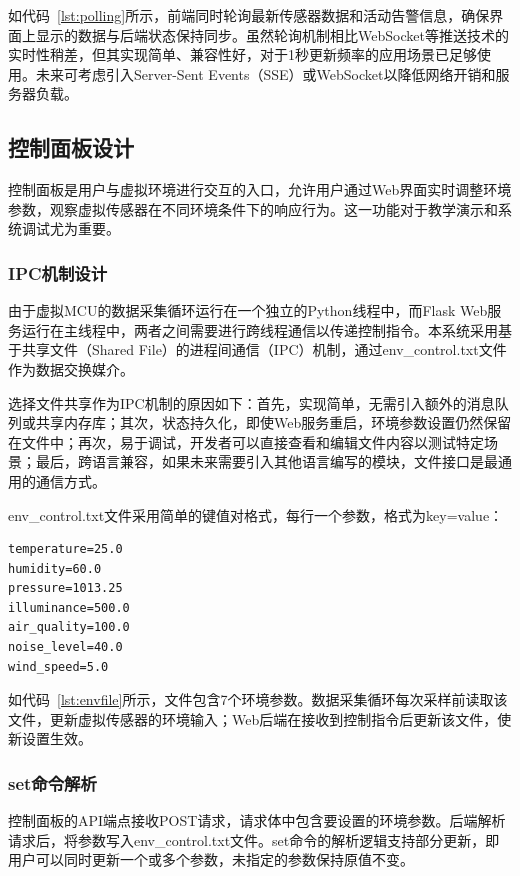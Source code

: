 \documentclass[12pt,a4paper]{ctexart}
\begin{document}
如代码~\ref{lst:polling}所示，前端同时轮询最新传感器数据和活动告警信息，确保界面上显示的数据与后端状态保持同步。虽然轮询机制相比WebSocket等推送技术的实时性稍差，但其实现简单、兼容性好，对于1秒更新频率的应用场景已足够使用。未来可考虑引入Server-Sent Events（SSE）或WebSocket以降低网络开销和服务器负载。

\subsection{控制面板设计}

控制面板是用户与虚拟环境进行交互的入口，允许用户通过Web界面实时调整环境参数，观察虚拟传感器在不同环境条件下的响应行为。这一功能对于教学演示和系统调试尤为重要。

\subsubsection{IPC机制设计}

由于虚拟MCU的数据采集循环运行在一个独立的Python线程中，而Flask Web服务运行在主线程中，两者之间需要进行跨线程通信以传递控制指令。本系统采用基于共享文件（Shared File）的进程间通信（IPC）机制，通过env\_control.txt文件作为数据交换媒介。

选择文件共享作为IPC机制的原因如下：首先，实现简单，无需引入额外的消息队列或共享内存库；其次，状态持久化，即使Web服务重启，环境参数设置仍然保留在文件中；再次，易于调试，开发者可以直接查看和编辑文件内容以测试特定场景；最后，跨语言兼容，如果未来需要引入其他语言编写的模块，文件接口是最通用的通信方式。

env\_control.txt文件采用简单的键值对格式，每行一个参数，格式为key=value：
\begin{lstlisting}[caption={环境控制文件格式示例},label={lst:envfile}]
temperature=25.0
humidity=60.0
pressure=1013.25
illuminance=500.0
air_quality=100.0
noise_level=40.0
wind_speed=5.0
\end{lstlisting}

如代码~\ref{lst:envfile}所示，文件包含7个环境参数。数据采集循环每次采样前读取该文件，更新虚拟传感器的环境输入；Web后端在接收到控制指令后更新该文件，使新设置生效。

\subsubsection{set命令解析}

控制面板的API端点接收POST请求，请求体中包含要设置的环境参数。后端解析请求后，将参数写入env\_control.txt文件。set命令的解析逻辑支持部分更新，即用户可以同时更新一个或多个参数，未指定的参数保持原值不变。
\end{document}
